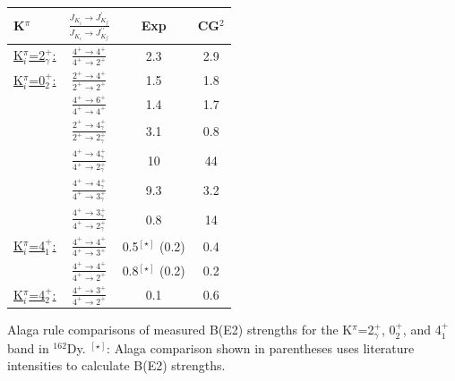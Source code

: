 \begin{table}
\begin{center}
 \begin{tabular}{l c c|c}
 K$^\pi$ & $\frac{J_{K_i}\rightarrow J^\prime_{K_f}}{J_{K_i}\rightarrow J^{\prime\prime}_{K_f}}$ & Exp & CG$^2$ \\
 \hline
 \hline
 \underline{K$^\pi_i$=2$^+_\gamma$:} & $\frac{4^+\rightarrow4^+}{4^+\rightarrow2^+}$ & 2.3 & 2.9 \\
 \hline
 \underline{K$^\pi_i$=0$^+_2$:} & $\frac{2^+\rightarrow4^+}{2^+\rightarrow2^+}$ & 1.5 & 1.8 \\
                                & $\frac{4^+\rightarrow6^+}{4^+\rightarrow4^+}$ & 1.4 & 1.7 \\
                                & $\frac{2^+\rightarrow4^+_\gamma}{2^+\rightarrow2^+_\gamma}$ & 3.1 & 0.8 \\
                                & $\frac{4^+\rightarrow4^+_\gamma}{4^+\rightarrow2^+_\gamma}$ & 10 & 44 \\
                                & $\frac{4^+\rightarrow4^+_\gamma}{4^+\rightarrow3^+_\gamma}$ & 9.3 & 3.2 \\
                                & $\frac{4^+\rightarrow3^+_\gamma}{4^+\rightarrow2^+_\gamma}$ & 0.8 & 14 \\
                                                            \hline
 \underline{K$^\pi_i$=4$^+_1$:} & $\frac{4^+\rightarrow4^+}{4^+\rightarrow3^+}$ & 0.5$^{[\star]}$ (0.2) & 0.4 \\     
                                & $\frac{4^+\rightarrow4^+}{4^+\rightarrow2^+}$ & 0.8$^{[\star]}$ (0.2) & 0.2 \\ \hline
 \underline{K$^\pi_i$=4$^+_2$:} & $\frac{4^+\rightarrow3^+}{4^+\rightarrow2^+}$ & 0.1 & 0.6 \\                               
 \end{tabular}
 \end{center}
Alaga rule comparisons of measured B(E2) strengths for the K$^\pi$=2$^+_\gamma$, 0$^+_2$, and 4$^+_1$ band in $^{162}$Dy. $^{[\star]}$: Alaga comparison shown in parentheses uses literature intensities to calculate B(E2) strengths.
 \end{table}

